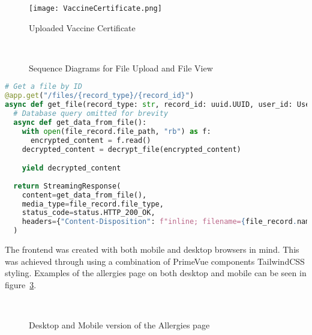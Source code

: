 \begin{figure}[htbp]
  \centering
  \texttt{[image: VaccineCertificate.png]}
  \caption{Uploaded Vaccine Certificate}\label{fig:vaccinecertificate}
\end{figure}

\FloatBarrier{}

\begin{figure}[ht]
  \centering
  \\
  \caption{Sequence Diagrams for File Upload and File View}\label{fig:fileuploadview}
\end{figure}

\FloatBarrier{}

\begin{lstlisting}[language=Python, caption=File Download Endpoint]
# Get a file by ID
@app.get("/files/{record_type}/{record_id}")
async def get_file(record_type: str, record_id: uuid.UUID, user_id: User = Depends(validate_session), session: Session = Depends(get_session)):    
  # Database query omitted for brevity
  async def get_data_from_file():
    with open(file_record.file_path, "rb") as f:
      encrypted_content = f.read()
    decrypted_content = decrypt_file(encrypted_content)

    yield decrypted_content
    
  return StreamingResponse(
    content=get_data_from_file(),
    media_type=file_record.file_type,
    status_code=status.HTTP_200_OK,
    headers={"Content-Disposition": f"inline; filename={file_record.name}"}
  )
\end{lstlisting}

The frontend was created with both mobile and desktop browsers in mind. This was achieved through using a combination of PrimeVue components TailwindCSS styling. Examples of the allergies page on both desktop and mobile can be seen in figure~\ref{fig:allergiespage}.

\begin{figure}[ht]
  \centering
  \\[\baselineskip]
  \caption{Desktop and Mobile version of the Allergies page}\label{fig:allergiespage}
\end{figure}

